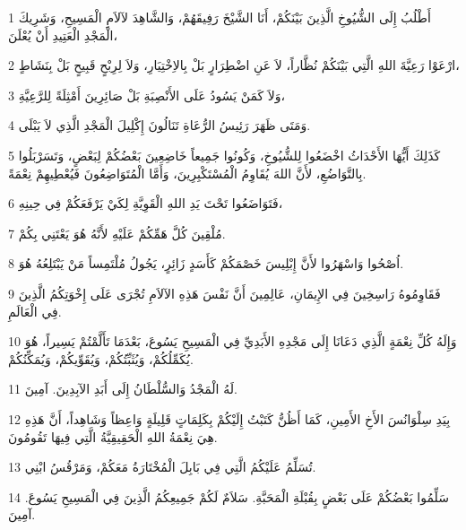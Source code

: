 \par 1 أَطْلُبُ إِلَى الشُّيُوخِ الَّذِينَ بَيْنَكُمْ، أَنَا الشَّيْخَ رَفِيقَهُمْ، وَالشَّاهِدَ لآلاَمِ الْمَسِيحِ، وَشَرِيكَ الْمَجْدِ الْعَتِيدِ أَنْ يُعْلَنَ،
\par 2 ارْعَوْا رَعِيَّةَ اللهِ الَّتِي بَيْنَكُمْ نُظَّاراً، لاَ عَنِ اضْطِرَارٍ بَلْ بِالاِخْتِيَارِ، وَلاَ لِرِبْحٍ قَبِيحٍ بَلْ بِنَشَاطٍ،
\par 3 وَلاَ كَمَنْ يَسُودُ عَلَى الأَنْصِبَةِ بَلْ صَائِرِينَ أَمْثِلَةً لِلرَّعِيَّةِ،
\par 4 وَمَتَى ظَهَرَ رَئِيسُ الرُّعَاةِ تَنَالُونَ إِكْلِيلَ الْمَجْدِ الَّذِي لاَ يَبْلَى.
\par 5 كَذَلِكَ أَيُّهَا الأَحْدَاثُ اخْضَعُوا لِلشُّيُوخِ، وَكُونُوا جَمِيعاً خَاضِعِينَ بَعْضُكُمْ لِبَعْضٍ، وَتَسَرْبَلُوا بِالتَّوَاضُعِ، لأَنَّ اللهَ يُقَاوِمُ الْمُسْتَكْبِرِينَ، وَأَمَّا الْمُتَوَاضِعُونَ فَيُعْطِيهِمْ نِعْمَةً.
\par 6 فَتَوَاضَعُوا تَحْتَ يَدِ اللهِ الْقَوِيَّةِ لِكَيْ يَرْفَعَكُمْ فِي حِينِهِ،
\par 7 مُلْقِينَ كُلَّ هَمِّكُمْ عَلَيْهِ لأَنَّهُ هُوَ يَعْتَنِي بِكُمْ.
\par 8 اُصْحُوا وَاسْهَرُوا لأَنَّ إِبْلِيسَ خَصْمَكُمْ كَأَسَدٍ زَائِرٍ، يَجُولُ مُلْتَمِساً مَنْ يَبْتَلِعُهُ هُوَ.
\par 9 فَقَاوِمُوهُ رَاسِخِينَ فِي الإِيمَانِ، عَالِمِينَ أَنَّ نَفْسَ هَذِهِ الآلاَمِ تُجْرَى عَلَى إِخْوَتِكُمُ الَّذِينَ فِي الْعَالَمِ.
\par 10 وَإِلَهُ كُلِّ نِعْمَةٍ الَّذِي دَعَانَا إِلَى مَجْدِهِ الأَبَدِيِّ فِي الْمَسِيحِ يَسُوعَ، بَعْدَمَا تَأَلَّمْتُمْ يَسِيراً، هُوَ يُكَمِّلُكُمْ، وَيُثَبِّتُكُمْ، وَيُقَوِّيكُمْ، وَيُمَكِّنُكُمْ.
\par 11 لَهُ الْمَجْدُ وَالسُّلْطَانُ إِلَى أَبَدِ الآبِدِينَ. آمِينَ.
\par 12 بِيَدِ سِلْوَانُسَ الأَخِ الأَمِينِ، كَمَا أَظُنُّ كَتَبْتُ إِلَيْكُمْ بِكَلِمَاتٍ قَلِيلَةٍ وَاعِظاً وَشَاهِداً، أَنَّ هَذِهِ هِيَ نِعْمَةُ اللهِ الْحَقِيقِيَّةُ الَّتِي فِيهَا تَقُومُونَ.
\par 13 تُسَلِّمُ عَلَيْكُمُ الَّتِي فِي بَابِلَ الْمُخْتَارَةُ مَعَكُمْ، وَمَرْقُسُ ابْنِي.
\par 14 سَلِّمُوا بَعْضُكُمْ عَلَى بَعْضٍ بِقُبْلَةِ الْمَحَبَّةِ. سَلاَمٌ لَكُمْ جَمِيعِكُمُ الَّذِينَ فِي الْمَسِيحِ يَسُوعَ. آمِينَ.


